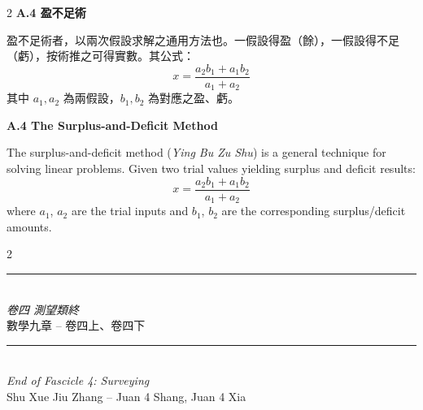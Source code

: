 \documentclass[11pt,a4paper]{article}
\begin{document}
\vspace{0.5em}

\begin{paracol}{2}
\switchcolumn[0]
\noindent\textbf{\color{sectioncolor}A.4 盈不足術}

盈不足術者，以兩次假設求解之通用方法也。一假設得盈（餘），一假設得不足（虧），按術推之可得實數。其公式：
\[
x = \frac{a_2 b_1 + a_1 b_2}{a_1 + a_2}
\]
其中 $a_1, a_2$ 為兩假設，$b_1, b_2$ 為對應之盈、虧。

\switchcolumn[1]
\noindent\textbf{\color{sectioncolor}A.4 The Surplus-and-Deficit Method}

The surplus-and-deficit method (\textit{Ying Bu Zu Shu}) is a general technique for solving linear problems. Given two trial values yielding surplus and deficit results:
\[
x = \frac{a_2 b_1 + a_1 b_2}{a_1 + a_2}
\]
where $a_1$, $a_2$ are the trial inputs and $b_1$, $b_2$ are the corresponding surplus/deficit amounts.
\end{paracol}

\vspace{1cm}

\begin{paracol}{2}
\switchcolumn[0]
\begin{center}
{\color{rulecolor}\rule{6cm}{0.4pt}}\\[0.5cm]
{\small\textit{卷四 測望類終}}\\[0.3cm]
{\small 數學九章 -- 卷四上、卷四下}
\end{center}

\switchcolumn[1]
\begin{center}
{\color{rulecolor}\rule{6cm}{0.4pt}}\\[0.5cm]
{\small\textit{End of Fascicle 4: Surveying}}\\[0.3cm]
{\small Shu Xue Jiu Zhang -- Juan 4 Shang, Juan 4 Xia}
\end{center}
\end{paracol}
\end{document}

